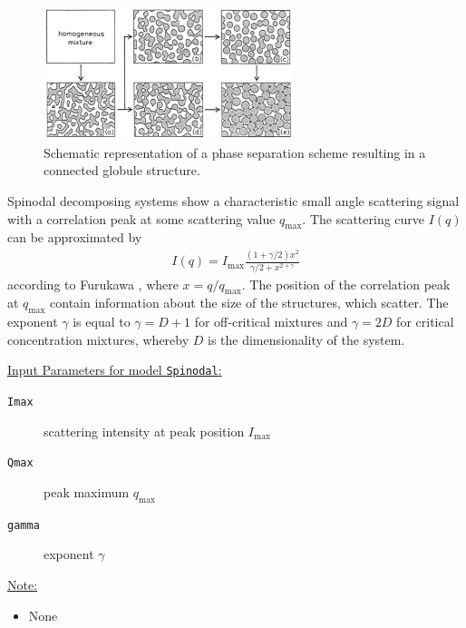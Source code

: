 \begin{figure}[htb]
\begin{center}
\includegraphics[width=0.648\textwidth]{spinodal2.png}
\end{center}
\caption{Schematic representation of a phase separation scheme
resulting in a connected globule structure.} \label{Spinodal}
\end{figure}

Spinodal decomposing systems show a characteristic small angle
scattering signal with a correlation peak at some scattering value
$q_\text{max}$. The scattering curve $I(q)$ can be approximated by
\begin{align}
I(q) = I_\text{max} \frac{(1+\gamma/2)x^2}{\gamma/2+x^{2+\gamma}}
\end{align}
according to Furukawa \cite{Furukawa1984}, where $x=q/q_\text{max}$.
The position of the correlation peak at $q_\text{max}$ contain
information about the size of the structures, which scatter. The
exponent $\gamma$ is equal to $\gamma=D+1$ for off-critical mixtures
and $\gamma=2D$ for critical concentration mixtures, whereby $D$ is
the dimensionality of the system.

\vspace{5mm}

\uline{Input Parameters for model \texttt{Spinodal}:}
\begin{description}
\item[\texttt{Imax}] scattering intensity at peak position $I_\text{max}$
\item[\texttt{Qmax}] peak maximum $q_\text{max}$
\item[\texttt{gamma}] exponent $\gamma$
\end{description}

\uline{Note:}
\begin{itemize}
\item None
\end{itemize}



